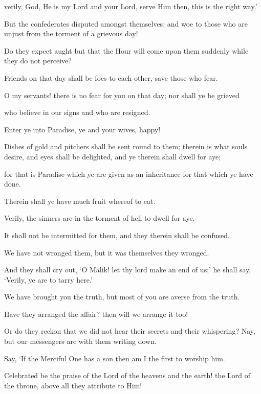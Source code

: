 \documentclass[fontsize=14pt, letterpaper, notitlepage, openany, DIV=12]{scrbook} %
\begin{document}
\noindent[43:64]
verily, God, He is my Lord and your Lord, serve Him then, this is the right way.'

\noindent[43:65]
But the confederates disputed amongst themselves; and woe to those who are unjust from
the torment of a grievous day!

\noindent[43:66]
Do they expect aught but that the Hour will come upon them suddenly while they do not
perceive?

\noindent[43:67]
Friends on that day shall be foes to each other, save those who fear.

\noindent[43:68]
O my servants! there is no fear for you on that day; nor shall ye be grieved

\noindent[43:69]
who believe in our signs and who are resigned.

\noindent[43:70]
Enter ye into Paradise, ye and your wives, happy!

\noindent[43:71]
Dishes of gold and pitchers shall be sent round to them; therein is what souls desire, and
eyes shall be delighted, and ye therein shall dwell for aye;

\noindent[43:72]
for that is Paradise which ye are given as an inheritance for that which ye have done.

\noindent[43:73]
Therein shall ye have much fruit whereof to eat.

\noindent[43:74]
Verily, the sinners are in the torment of hell to dwell for aye.

\noindent[43:75]
It shall not be intermitted for them, and they therein shall be confused.

\noindent[43:76]
We have not wronged them, but it was themselves they wronged.

\noindent[43:77]
And they shall cry out, `O Malik! let thy lord make an end of us;' he shall say, `Verily, ye
are to tarry here.'

\noindent[43:78]
We have brought you the truth, but most of you are averse from the truth.

\noindent[43:79]
Have they arranged the affair? then will we arrange it too!

\noindent[43:80]
Or do they reckon that we did not hear their secrets and their whispering? Nay, but our
messengers are with them writing down.

\noindent[43:81]
Say, `If the Merciful One has a son then am I the first to worship him.

\noindent[43:82]
Celebrated be the praise of the Lord of the heavens and the earth! the Lord of the throne,
above all they attribute to Him!
\end{document}
